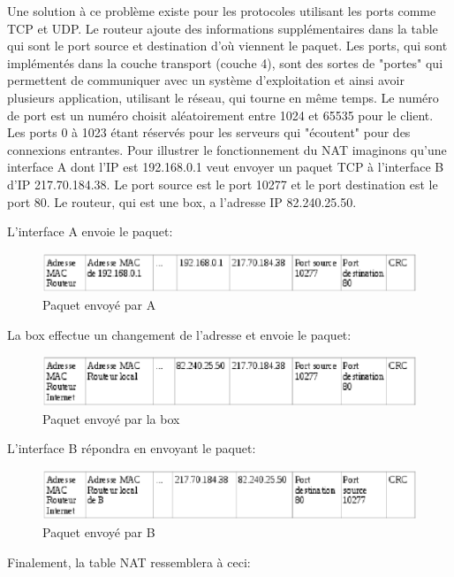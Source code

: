 Une solution à ce problème existe pour les protocoles utilisant les ports comme
TCP et UDP. Le routeur ajoute des informations supplémentaires dans la table
qui sont le port source et destination d'où viennent le paquet. Les ports, qui
sont implémentés dans la couche transport (couche 4), sont des sortes de
"portes" qui permettent de communiquer avec un système d'exploitation et ainsi
avoir plusieurs application, utilisant le réseau, qui tourne en même temps. Le
numéro de port est un numéro choisit aléatoirement entre 1024 et 65535 pour le
client. Les ports 0 à 1023 étant réservés pour les serveurs qui "écoutent" pour
des connexions entrantes.
\newline
Pour illustrer le fonctionnement du NAT imaginons qu'une interface A dont l'IP
est 192.168.0.1 veut envoyer un paquet TCP à l'interface B d'IP 217.70.184.38.
Le port source est le port 10277 et le port destination est le port 80. Le
routeur, qui est une box, a l'adresse IP  82.240.25.50.

L'interface A envoie le paquet:
\begin{figure}[h]
\centering
\includegraphics[width=12cm]{./pics/PaquetAR.eps}
\caption{Paquet envoyé par A}
\label{fig:paquetAR}
\end{figure}

La box effectue un changement de l'adresse et envoie le paquet:
\begin{figure}[h]
\centering
\includegraphics[width=12cm]{./pics/PaquetRB.eps}
\caption{Paquet envoyé par la box}
\label{fig:paquetRB}
\end{figure}

L'interface B répondra en envoyant le paquet:
\begin{figure}[h]
\centering
\includegraphics[width=12cm]{./pics/PaquetBR.eps}
\caption{Paquet envoyé par B}
\label{fig:paquetBR}
\end{figure}
\smallbreak
Finalement, la table NAT ressemblera à ceci:


